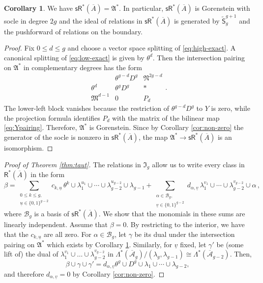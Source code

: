 \documentclass[11pt]{article}
\def\R{\mathsf{R}}
\def\sR{\mathsf{sR}}
\newcommand{\barA}{\overline{A}}
\newcommand{\sfS}{\mathsf{S}}
\theoremstyle{definition}
\newtheorem{corollary}[definition]{Corollary}
\begin{document}
\begin{corollary}\label{thm:Gor}
We have $\sR^*(\barA) = \mathfrak A^*$. In particular, $\sR^*(\barA)$ is Gorenstein with socle in degree $2g$ and the ideal of relations in $\sR^*(\barA)$ is generated by $\widetilde{\sfS}_g^{g+1}$ and the pushforward of relations on the boundary.
\end{corollary}

\begin{proof}
Fix $0\leq d\leq g$ and choose a vector space splitting of
 \eqref{eq:high-exact}. A canonical splitting of \eqref{eq:low-exact} is given by $\theta^d$. Then the intersection pairing on $\mathfrak A^*$ in complementary degrees has the form
\[
 \begin{array}{c|cc}
  &\theta^{g-d}D^g&\mathfrak N^{2g-d}\\ \hline
  \theta^d&\theta^gD^g&*\\
  \mathfrak M^{d-1}&0&P_d
 \end{array}.
\]
The lower-left block vanishes because the restriction of $\theta^{g-d}D^g$ to $Y$ is zero, while the projection formula identifies $P_d$ with the matrix of the bilinear map \eqref{eq:Ypairing}. Therefore, $\mathfrak A^*$ is Gorenstein. Since by Corollary \ref{cor:non-zero} the generator of the socle is nonzero in $\sR^*(\barA)$, the map $\mathfrak A^* \to \sR^*(\barA)$ is an isomorphism.
\end{proof}

\begin{proof}[Proof of Theorem \ref{thm:taut}]
	The relations in $\mathfrak I_g$ allow us to write every class in $\R^*(\barA)$ in the form
    $$
    \beta = \sum_{\substack{0\leq k\leq g,\\\underline{u}\in \{0,1\}^{g-2}}}c_{k, \underline{u}}\,\theta^k\cup \lambda_1^{u_1}\cup \cdots \cup \lambda ^{u_{g-2}}_{g-2} \cup \lambda_{g-1} + \sum_{\substack{\alpha \in \mathcal B_g,\\
    \underline{v}\in \{0,1\}^{g-2}}}d_{\alpha, \underline{v}}\,\lambda_1^{v_1}\cup \cdots \cup \lambda_{g-2}^{v_{g-2}} \cup \alpha\, ,
    $$
	where $\mathcal B_g$ is a basis of $\sR^*(\barA)$. We show that the monomials in these sums are linearly independent. Assume that $\beta=0$. By restricting to the interior, we have that the $c_{k, \underline{u}}$ are all zero. For $\alpha \in \mathcal B_g$, let $\gamma $ be its dual under the intersection pairing on $\mathfrak A^*$ which exists by Corollary \ref{thm:Gor}. Similarly, for $\underline{v}$ fixed,
	let $\gamma'$ be (some lift of) the dual of $\lambda_1^{v_1}\cup\dots\cup \lambda_{g-2}^{v_{g-2}}$ in $\Lambda^{\ast}(\overline{\mathcal{A}}_g)/(\lambda_g,\lambda_{g-1})\cong \Lambda^{\ast}(\overline{\mathcal{A}}_{g-2})$.
	Then,
    $$
    \beta \cup \gamma \cup \gamma' = d_{\alpha, \underline{v}}\theta^g\cup D^g \cup \lambda_1\cup \cdots \cup \lambda_{g-2},
    $$
    and therefore $d_{\alpha, \underline{v}}=0$ by Corollary \ref{cor:non-zero}.
\end{proof}
\end{document}
